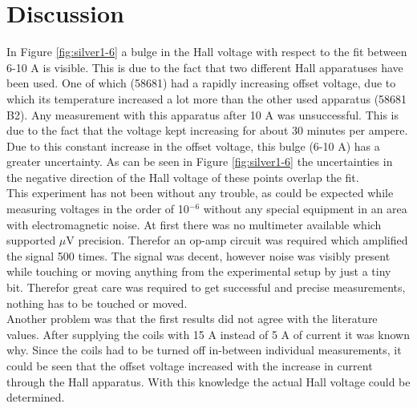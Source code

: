 \chapter{Discussion}
In Figure \ref{fig:silver1-6} a bulge in the Hall voltage with respect to the fit between 6-10 A is visible. This is due to the fact that two different Hall apparatuses have been used. One of which (58681) had a rapidly increasing offset voltage, due to which its temperature increased a lot more than the other used apparatus (58681 B2). Any measurement with this apparatus after 10 A was unsuccessful. This is due to the fact that the voltage kept increasing for about 30 minutes per ampere. Due to this constant increase in the offset voltage, this bulge (6-10 A) has a greater uncertainty. As can be seen in Figure \ref{fig:silver1-6} the uncertainties in the negative direction of the Hall voltage of these points overlap the fit.\\
This experiment has not been without any trouble, as could be expected while measuring voltages in the order of 10$^{-6}$ without any special equipment in an area with electromagnetic noise. At first there was no multimeter available which supported $\mu$V precision. Therefor an op-amp circuit was required which amplified the signal 500 times. The signal was decent, however noise was visibly present while touching or moving anything from the experimental setup by just a tiny bit. Therefor great care was required to get successful and precise measurements, nothing has to be touched or moved. \\
Another problem was that the first results did not agree with the literature values. After supplying the coils with 15 A instead of 5 A of current it was known why. Since the coils had to be turned off in-between individual measurements, it could be seen that the offset voltage increased with the increase in current through the Hall apparatus. With this knowledge the actual Hall voltage could be determined. \\